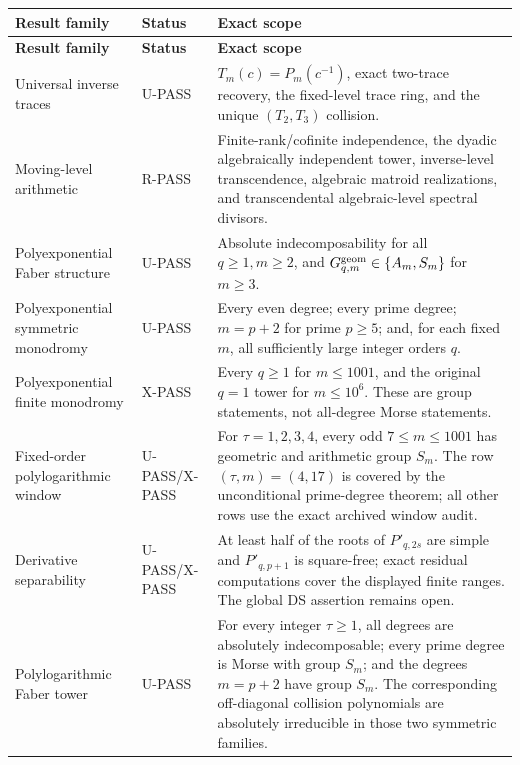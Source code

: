 \documentclass[11pt]{article}
\theoremstyle{keio}
\theoremstyle{definition}
\theoremstyle{remark}
\newcommand{\UPASS}{\textcolor{keiogreen}{\textsf{U-PASS}}}
\newcommand{\XPASS}{\textcolor{keioxblue}{\textsf{X-PASS}}}
\newcommand{\RPASS}{\textcolor{keioxblue}{\textsf{R-PASS}}}
\begin{document}
\begin{longtable}{@{}p{}p{}p{}@{}}
\toprule
\textbf{Result family}&\textbf{Status}&\textbf{Exact scope}\\
\midrule
\endfirsthead
\toprule
\textbf{Result family}&\textbf{Status}&\textbf{Exact scope}\\
\midrule
\endhead
Universal inverse traces&\UPASS&
\(T_m(c)=P_m(c^{-1})\), exact two-trace recovery, the fixed-level trace
ring, and the unique \((T_2,T_3)\) collision.\\

Moving-level arithmetic&\RPASS&
Finite-rank/cofinite independence, the dyadic algebraically independent
tower, inverse-level transcendence, algebraic matroid realizations, and
transcendental algebraic-level spectral divisors.\\

Polyexponential Faber structure&\UPASS&
Absolute indecomposability for all \(q\ge1,m\ge2\), and
\(G^{\rm geom}_{q,m}\in\{A_m,S_m\}\) for \(m\ge3\).\\

Polyexponential symmetric monodromy&\UPASS&
Every even degree; every prime degree; \(m=p+2\) for prime \(p\ge5\); and,
for each fixed \(m\), all sufficiently large integer orders \(q\).\\

Polyexponential finite monodromy&\XPASS&
Every \(q\ge1\) for \(m\le1001\), and the original \(q=1\) tower for
\(m\le10^6\).  These are group statements, not all-degree Morse statements.\\

Fixed-order polylogarithmic window&\UPASS/\XPASS&
For \(\tau=1,2,3,4\), every odd \(7\le m\le1001\) has geometric and
arithmetic group \(S_m\).  The row \((\tau,m)=(4,17)\) is covered by the
unconditional prime-degree theorem; all other rows use the exact archived
window audit.\\

Derivative separability&\UPASS/\XPASS&
At least half of the roots of \(P'_{q,2s}\) are simple and
\(P'_{q,p+1}\) is square-free; exact residual computations cover the
displayed finite ranges.  The global DS assertion remains open.\\

Polylogarithmic Faber tower&\UPASS&
For every integer \(\tau\ge1\), all degrees are absolutely indecomposable;
every prime degree is Morse with group \(S_m\); and the degrees \(m=p+2\)
have group \(S_m\).  The corresponding off-diagonal collision polynomials
are absolutely irreducible in those two symmetric families.\\


\end{longtable}
\end{document}
